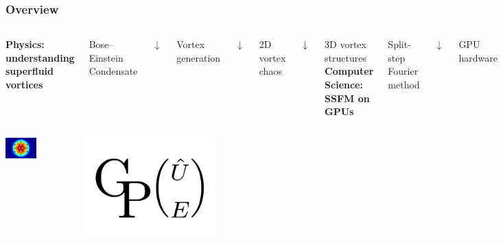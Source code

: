 \documentclass{beamer}
\begin{document}
\begin{frame}
\frametitle{Overview}
\begin{columns}
\center
\textbf{Physics: understanding superfluid vortices}

\vspace{0.5cm}

Bose--Einstein Condensate

$\downarrow$

Vortex generation

$\downarrow$

2D vortex chaos

$\downarrow$

3D vortex structures
\center
\textbf{Computer Science: SSFM on GPUs}

\vspace{0.5cm}

Split-step Fourier method

$\downarrow$

GPU hardware

$\downarrow$

GPUE codebase

$\downarrow$

Optimizations
\end{columns}

\begin{columns}
\begin{center}
\includegraphics[width=0.5\textwidth]{density_L10_cut.png}
\end{center}
\begin{center}
\includegraphics[width=0.5\textwidth]{GPUE.png}
\end{center}
\end{columns}

\end{frame}
\end{document}

